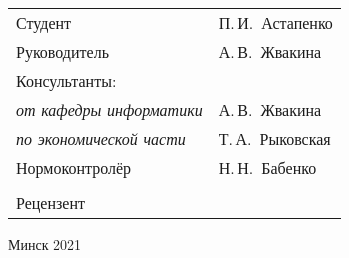 \begin{titlepage}
\begin{center}
    \begin{tabular}{ p{}p{} }
      Студент & П.\,И.~Астапенко \\
      Руководитель & А.\,В.~Жвакина \\
      Консультанты: &\\
      \hspace*{3ex}\emph{от кафедры информатики} & А.\,В.~Жвакина \\
      \hspace*{3ex}\emph{по экономической части} & Т.\,А.~Рыковская \\
      Нормоконтролёр & Н.\,Н.~Бабенко\\
      & \\
      Рецензент &
    \end{tabular}
    
    \vfill
    {\normalsize Минск 2021}
  \end{center}
\end{titlepage}
